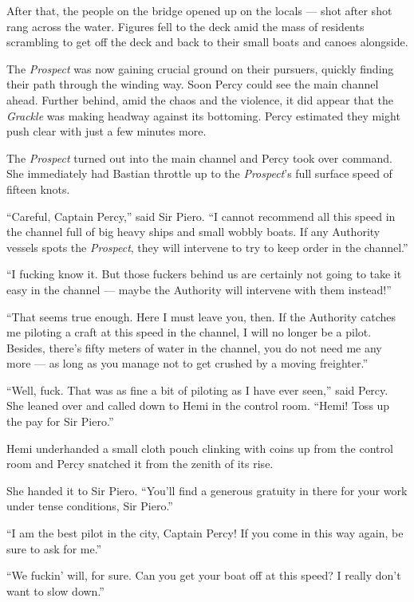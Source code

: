 \documentclass[
]{scrbook}
\begin{document}
After that, the people on the bridge opened up on the locals --- shot
after shot rang across the water. Figures fell to the deck amid the mass
of residents scrambling to get off the deck and back to their small
boats and canoes alongside.

The \emph{Prospect} was now gaining crucial ground on their pursuers,
quickly finding their path through the winding way. Soon Percy could see
the main channel ahead. Further behind, amid the chaos and the violence,
it did appear that the \emph{Grackle} was making headway against its
bottoming. Percy estimated they might push clear with just a few minutes
more.

The \emph{Prospect} turned out into the main channel and Percy took over
command. She immediately had Bastian throttle up to the
\emph{Prospect}'s full surface speed of fifteen knots.

``Careful, Captain Percy,'' said Sir Piero. ``I cannot recommend all
this speed in the channel full of big heavy ships and small wobbly
boats. If any Authority vessels spots the \emph{Prospect}, they will
intervene to try to keep order in the channel.''

``I fucking know it. But those fuckers behind us are certainly not going
to take it easy in the channel --- maybe the Authority will intervene
with them instead!''

``That seems true enough. Here I must leave you, then. If the Authority
catches me piloting a craft at this speed in the channel, I will no
longer be a pilot. Besides, there's fifty meters of water in the
channel, you do not need me any more --- as long as you manage not to
get crushed by a moving freighter.''

``Well, fuck. That was as fine a bit of piloting as I have ever seen,''
said Percy. She leaned over and called down to Hemi in the control room.
``Hemi! Toss up the pay for Sir Piero.''

Hemi underhanded a small cloth pouch clinking with coins up from the
control room and Percy snatched it from the zenith of its rise.

She handed it to Sir Piero. ``You'll find a generous gratuity in there
for your work under tense conditions, Sir Piero.''

``I am the best pilot in the city, Captain Percy! If you come in this
way again, be sure to ask for me.''

``We fuckin' will, for sure. Can you get your boat off at this speed? I
really don't want to slow down.''
\end{document}
